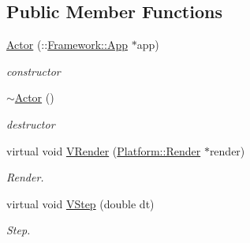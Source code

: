 \subsection*{Public Member Functions}
\begin{DoxyCompactItemize}
\item 
\hypertarget{classContent_1_1Actor_1_1Actor_abd96bf199131f0e25e665d7774ad9dde}{
\hyperlink{classContent_1_1Actor_1_1Actor_abd96bf199131f0e25e665d7774ad9dde}{Actor} (::\hyperlink{classFramework_1_1App}{Framework::App} $\ast$app)}
\label{classContent_1_1Actor_1_1Actor_abd96bf199131f0e25e665d7774ad9dde}

\begin{DoxyCompactList}\small\item\em constructor \item\end{DoxyCompactList}\item 
\hypertarget{classContent_1_1Actor_1_1Actor_a81d996f24663044d5a861789dace3f39}{
\hyperlink{classContent_1_1Actor_1_1Actor_a81d996f24663044d5a861789dace3f39}{$\sim$Actor} ()}
\label{classContent_1_1Actor_1_1Actor_a81d996f24663044d5a861789dace3f39}

\begin{DoxyCompactList}\small\item\em destructor \item\end{DoxyCompactList}\item 
\hypertarget{classContent_1_1Actor_1_1Actor_afb0a396da7a4b31cb97f2e8b5b1c9bb2}{
virtual void \hyperlink{classContent_1_1Actor_1_1Actor_afb0a396da7a4b31cb97f2e8b5b1c9bb2}{VRender} (\hyperlink{classPlatform_1_1Render}{Platform::Render} $\ast$render)}
\label{classContent_1_1Actor_1_1Actor_afb0a396da7a4b31cb97f2e8b5b1c9bb2}

\begin{DoxyCompactList}\small\item\em Render. \item\end{DoxyCompactList}\item 
\hypertarget{classContent_1_1Actor_1_1Actor_a708373335bb98a98fb93f6991e8f1be8}{
virtual void \hyperlink{classContent_1_1Actor_1_1Actor_a708373335bb98a98fb93f6991e8f1be8}{VStep} (double dt)}
\label{classContent_1_1Actor_1_1Actor_a708373335bb98a98fb93f6991e8f1be8}

\begin{DoxyCompactList}\small\item\em Step. \item\end{DoxyCompactList}\end{DoxyCompactItemize}


